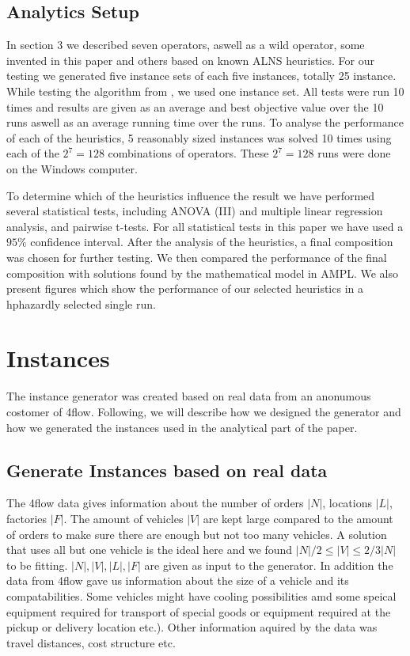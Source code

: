 \documentclass[../main.tex]{subfiles}
\begin{document}
\subsection{Analytics Setup}
\label{sec:analy}
In section 3 we described seven operators, aswell as a wild operator, some invented in this paper and others based on known ALNS heuristics. 
For our testing we generated five instance sets of each five instances, totally 25 instance.
While testing the algorithm from , we used one instance set. 
All tests were run 10 times and results are given as an average and best objective value over the 10 runs aswell as an average running time over the runs.
To analyse the performance of each of the heuristics, 5 reasonably sized instances was solved 10 times using each of the $2^7 = 128$ combinations of operators.
These $2^7=128$ runs were done on the Windows computer. \par
To determine which of the heuristics influence the result we have performed several statistical tests, including ANOVA (III) and multiple linear regression analysis, and pairwise t-tests. 
For all statistical tests in this paper we have used a $95\%$ confidence interval.
After the analysis of the heuristics, a final composition was chosen for further testing.
We then compared the performance of the final composition with solutions found by the mathematical model in AMPL. We also present figures which show the performance of our selected heuristics in a hphazardly selected single run.

\section{Instances}
\label{sec:ins}
The instance generator was created based on real data from an anonumous costomer of 4flow. 
Following, we will describe how we designed the generator and how we generated the instances used in the analytical part of the paper.

\subsection{Generate Instances based on real data}
\label{sec:data}
The 4flow data gives information about the number of orders $|N|$, locations $|L|$, factories $|F|$. 
The amount of vehicles $|V|$ are kept large compared to the amount of orders to make sure there are enough but not too many vehicles. 
A solution that uses all but one vehicle is the ideal here and we found $|N|/2 \leq |V| \leq 2/3 |N|$ to be fitting.
$|N|, |V|, |L|, |F|$ are given as input to the generator.
In addition the data from 4flow gave us information about the size of a vehicle and its compatabilities. 
Some vehicles might have cooling possibilities amd some speical equipment required for transport of special goods or equipment required at the pickup or delivery location etc.).
Other information aquired by the data was travel distances, cost structure etc.
\end{document}
